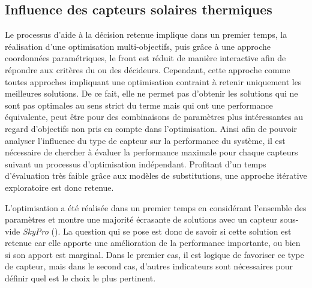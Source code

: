 



\subsection{Influence des capteurs solaires thermiques} %
\label{sub:influence_des_capteurs_solaires_thermiques}
Le processus d’aide à la décision retenue implique dans un premier temps, la réalisation
d’une optimisation multi-objectifs, puis grâce à une approche coordonnées paramétriques,
le front est réduit de manière interactive afin de répondre aux critères du ou des
décideurs. Cependant, cette approche comme toutes approches impliquant une optimisation
contraint à retenir uniquement les meilleures solutions. De ce fait, elle ne permet pas
d’obtenir les solutions qui ne sont pas optimales au sens strict du terme mais qui ont
une performance équivalente, peut être pour des combinaisons de paramètres plus
intéressantes au regard d’objectifs non pris en compte dans l’optimisation. Ainsi afin de
pouvoir analyser l’influence du type de capteur sur la performance du système, il est
nécessaire de chercher à évaluer la performance maximale pour chaque capteurs suivant un
processus d’optimisation indépendant. Profitant d’un temps d’évaluation très faible grâce
aux modèles de substitutions, une approche itérative exploratoire est donc retenue.

L’optimisation a été réalisée dans un premier temps en considérant l’ensemble
des paramètres et montre une majorité écrasante de solutions avec un capteur
sous-vide \textit{SkyPro} (). La question qui se pose
est donc de savoir si cette solution est retenue car elle apporte une amélioration de la
performance importante, ou bien si son apport est marginal. Dans le premier cas, il est
logique de favoriser ce type de capteur, mais dans le second cas, d’autres indicateurs
sont nécessaires pour définir quel est le choix le plus pertinent.

